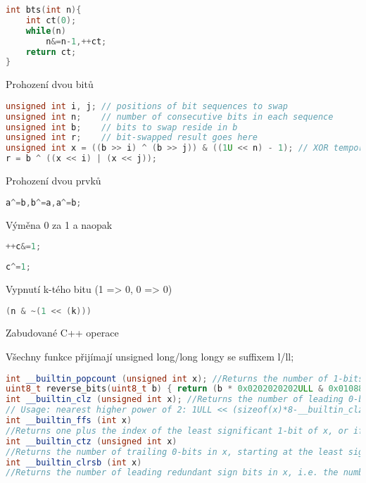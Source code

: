\documentclass[11pt]{article}
\begin{document}
\begin{lstlisting}[language=C++]
int bts(int n){
    int ct(0);
    while(n)
        n&=n-1,++ct;
    return ct;
}
\end{lstlisting}
\begin{center}
Prohození dvou bitů
\end{center}
\begin{lstlisting}[language=C++]
unsigned int i, j; // positions of bit sequences to swap
unsigned int n;    // number of consecutive bits in each sequence
unsigned int b;    // bits to swap reside in b
unsigned int r;    // bit-swapped result goes here
unsigned int x = ((b >> i) ^ (b >> j)) & ((1U << n) - 1); // XOR temporary
r = b ^ ((x << i) | (x << j));
\end{lstlisting}
\begin{center}
Prohození dvou prvků
\end{center}
\begin{lstlisting}[language=C++]
a^=b,b^=a,a^=b;
\end{lstlisting}
\begin{center}
Výměna 0 za 1 a naopak
\end{center}
\begin{lstlisting}[language=C++]
++c&=1;
\end{lstlisting}
\begin{lstlisting}[language=C++]
c^=1;
\end{lstlisting}
\begin{center}
Vypnutí k-tého bitu (1 => 0, 0 => 0)
\end{center}
\begin{lstlisting}[language=C++]
(n & ~(1 << (k)))
\end{lstlisting}
\begin{center}
Zabudované C++ operace
\end{center}
Všechny funkce přijímají unsigned long/long longy se suffixem l/ll;
\begin{lstlisting}[language=C++]
int __builtin_popcount (unsigned int x); //Returns the number of 1-bits in x.
uint8_t reverse_bits(uint8_t b) { return (b * 0x0202020202ULL & 0x010884422010ULL) % 1023; }
int __builtin_clz (unsigned int x); //Returns the number of leading 0-bits in x, starting at the most significant bit position. If x is 0, the result is undefined. 
// Usage: nearest higher power of 2: 1ULL << (sizeof(x)*8-__builtin_clz(x))
int __builtin_ffs (int x)
//Returns one plus the index of the least significant 1-bit of x, or if x is zero, returns zero.
int __builtin_ctz (unsigned int x)
//Returns the number of trailing 0-bits in x, starting at the least significant bit position. If x is 0, the result is undefined.
int __builtin_clrsb (int x)
//Returns the number of leading redundant sign bits in x, i.e. the number of bits following the most significant bit that are identical to it. There are no special cases for 0 or other values.
\end{lstlisting}
\end{document}
